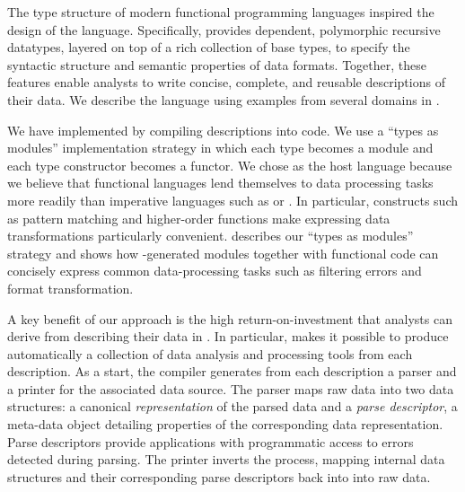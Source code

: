 
The type structure of modern functional programming languages inspired the design of the \padsml{} language.  
Specifically, \padsml{} provides dependent, polymorphic recursive datatypes, layered on top of a rich collection of base types, to specify the syntactic structure and semantic properties of data
formats.  Together, these features enable analysts to write concise,
complete, and reusable descriptions of their data.  
We describe the \padsml{} language using examples from several domains
in .


We have implemented \padsml{} by compiling descriptions into
\ocaml{} code.  We use a
``types as modules'' implementation strategy in which each \padsml{} type
becomes a module and each \padsml{} type constructor becomes a functor. 
We chose \ml{} as the host language because we believe that 
functional languages lend themselves to data processing tasks more readily than imperative languages such as \C{} or \java{}.  In particular, constructs such as pattern matching and higher-order functions make expressing data transformations particularly convenient.  describes our ``types as modules''
strategy and shows how \padsml{}-generated modules together
with functional \ocaml{} code can concisely express
common
data-processing tasks such as filtering errors and format transformation.



A key benefit of our approach is the high return-on-investment that
analysts can derive from describing their data in \padsml{}.  In particular, \padsml{} makes it possible to produce automatically a collection of data analysis and processing tools from each description.   
As a start, the \padsml{} compiler generates from each description a parser and a printer for the associated data source.  The parser maps raw 
data into two data
structures: a canonical \textit{representation} of the parsed data and
a \textit{parse descriptor}, a meta-data object detailing properties
of the corresponding data representation.  Parse descriptors provide
applications with programmatic access to errors detected during
parsing.  The printer inverts the process, mapping internal data structures
and their corresponding parse descriptors back into into raw data.


